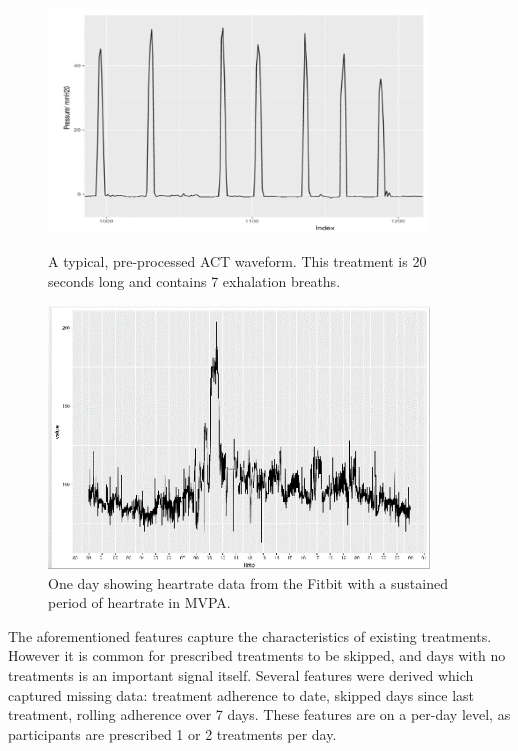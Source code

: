 \documentclass{article}
\begin{document}
\begin{figure}
    \centering
    \begin{minipage}{0.45\textwidth}
        \centering
        \includegraphics[width=0.9\textwidth]{individual_breaths.png} %
        \caption{A typical, pre-processed ACT waveform. This treatment is 20 seconds long and contains 7 exhalation breaths.}
        \label{fig:individual_breaths}
    \end{minipage}\hfill
    \begin{minipage}{0.45\textwidth}
        \centering
        \includegraphics[width=0.9\textwidth]{HR.png} %
        \caption{One day showing heartrate data from the Fitbit with a sustained period of heartrate in MVPA.}
         \label{fig:HR}
    \end{minipage}
\end{figure}


The aforementioned features capture the characteristics of existing treatments. However it is common for prescribed treatments to be skipped, and days with no treatments is an important signal itself. Several features were derived which captured missing data: treatment adherence to date, skipped days since last treatment, rolling adherence over 7 days. These features are on a per-day level, as participants are prescribed 1 or 2 treatments per day. 
\end{document}
